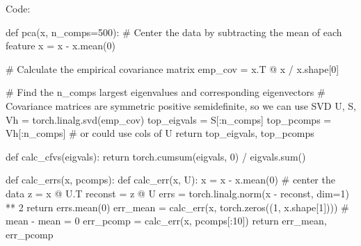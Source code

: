 \documentclass[submit]{harvardml}
\begin{document}
Code:

\begin{python}
def pca(x, n_comps=500):
    # Center the data by subtracting the mean of each feature
    x = x - x.mean(0)

    # Calculate the empirical covariance matrix
    emp_cov = x.T @ x / x.shape[0]

    # Find the n_comps largest eigenvalues and corresponding eigenvectors
    # Covariance matrices are symmetric positive semidefinite, so we can use SVD
    U, S, Vh = torch.linalg.svd(emp_cov)
    top_eigvals = S[:n_comps]
    top_pcomps = Vh[:n_comps] # or could use cols of U
    return top_eigvals, top_pcomps


def calc_cfvs(eigvals):
    return torch.cumsum(eigvals, 0) / eigvals.sum()


def calc_errs(x, pcomps):
    def calc_err(x, U):
        x = x - x.mean(0) # center the data
        z = x @ U.T
        reconst = z @ U
        errs = torch.linalg.norm(x - reconst, dim=1) ** 2
        return errs.mean(0)
    err_mean = calc_err(x, torch.zeros((1, x.shape[1]))) # mean - mean = 0
    err_pcomp = calc_err(x, pcomps[:10])
return err_mean, err_pcomp
\end{python}
\end{document}
